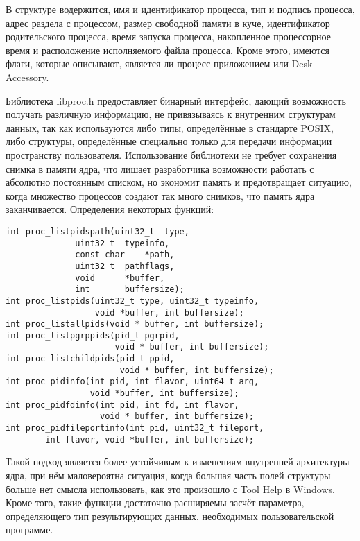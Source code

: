 В структуре водержится, имя и идентификатор процесса, тип и подпись процесса,
адрес раздела с процессом, размер свободной памяти в куче, идентификатор
родительского процесса, время запуска процесса, накопленное процессорное время и
расположение исполняемого файла процесса. Кроме этого, имеются флаги, которые
описывают, является ли процесс приложением или Desk Accessory.

Библиотека libproc.h предоставляет бинарный интерфейс, дающий возможность получать
различную информацию, не привязываясь к внутренним структурам данных, так как
используются либо типы, определённые в стандарте POSIX, либо структуры,
определённые специально только для передачи информации пространству
пользователя\cite{libproc}. Использование библиотеки не требует сохранения
снимка в памяти ядра, что лишает разработчика возможности работать с абсолютно
постоянным списком, но экономит память и предотвращает ситуацию, когда множество
процессов создают так много снимков, что память ядра заканчивается. Определения
некоторых функций:

\medskip
\begin{adjustwidth}{\fivecharsapprox}{}
\begin{lstlisting}[basicstyle=\fontencoding{T1}\small\ttfamily]
int	proc_listpidspath(uint32_t	type,
			  uint32_t	typeinfo,
			  const char	*path,
			  uint32_t	pathflags,
			  void		*buffer,
			  int		buffersize);
int proc_listpids(uint32_t type, uint32_t typeinfo,
                  void *buffer, int buffersize);
int proc_listallpids(void * buffer, int buffersize);
int proc_listpgrppids(pid_t pgrpid,
                      void * buffer, int buffersize);
int proc_listchildpids(pid_t ppid,
                       void * buffer, int buffersize);
int proc_pidinfo(int pid, int flavor, uint64_t arg,
                 void *buffer, int buffersize);
int proc_pidfdinfo(int pid, int fd, int flavor,
                   void * buffer, int buffersize);
int proc_pidfileportinfo(int pid, uint32_t fileport,
        int flavor, void *buffer, int buffersize);
\end{lstlisting}
\end{adjustwidth}
\medskip

Такой подход является более устойчивым к изменениям внутренней архитектуры ядра,
при нём маловероятна ситуация, когда большая часть полей структуры больше нет
смысла использовать, как это произошло с Tool Help в Windows. Кроме того, такие
функции достаточно расширяемы засчёт параметра, определяющего тип результирующих
данных, необходимых пользовательской программе.

